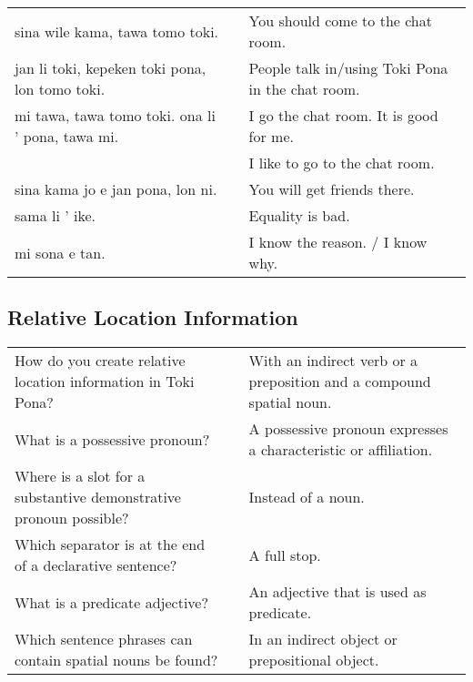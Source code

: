 \begin{supertabular}{p{5,5cm}|ll}
    sina wile kama, tawa tomo toki.                  &  & You should come to the chat room.                \\
    jan li toki, kepeken toki pona, lon tomo toki.   &  & People talk in/using Toki Pona in the chat room. \\
    mi tawa, tawa tomo toki. ona li ' pona, tawa mi. &  & I go the chat room. It is good for me.           \\
                                                     &  & I like to go to the chat room.                   \\ %
    sina kama jo e jan pona, lon ni.                 &  & You will get friends there.                      \\
    sama li ' ike.                                   &  & Equality is bad.                                 \\
    mi sona e tan.                                   &  & I know the reason. / I know why.                 \\
\end{supertabular}

\newpage
%
\subsection*{Relative Location Information}
\label{'other_prepositions'}
%
\begin{supertabular}{p{5,5cm}|ll}
    How do you create relative location information in Toki Pona?     &  & With an indirect verb or a preposition and a compound spatial noun. \\ %
    What is a possessive pronoun?                                     &  & A possessive pronoun expresses a characteristic or affiliation.     \\ %
    Where is a slot for a substantive demonstrative pronoun possible? &  & Instead of a noun.                                                  \\ %
    Which separator is at the end of a declarative sentence?          &  & A full stop.                                                        \\ %
    What is a predicate adjective?                                    &  & An adjective that is used as predicate.                             \\ %
    Which sentence phrases can contain spatial nouns be found?        &  & In an indirect object or prepositional object.                      \\ %
\end{supertabular}

